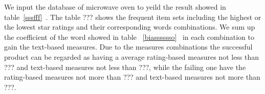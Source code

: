 \documentclass[12pt]{article}%
\begin{document}
We input the database of microwave oven to yeild the result showed in table~\ref{sssfff}~. The table ??? shows the frequent item sets including the highest or the lowest star ratings and their corresponding words combinations. We sum up the coefficient of the word showed in table ~\ref{biasssssso}~ in each combination to gain the text-based measures. Due to the measures combinations the successful product can be regarded as having a average rating-based measures not less than ??? and text-based measures not less than ???, while the failing one have the rating-based measures not more than ??? and text-based measures not more than ???.
\end{document}
